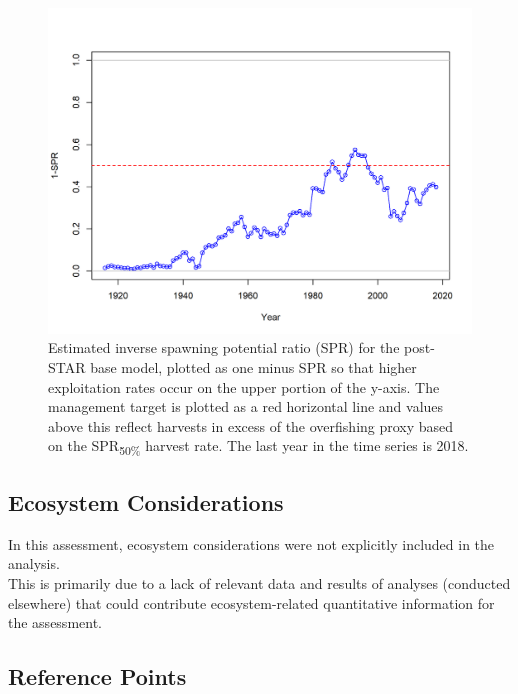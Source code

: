 \documentclass[12pt,]{article}
\begin{document}
\FloatBarrier

\begin{figure}
\centering
\includegraphics{r4ss/plots_mod1/SPR2_minusSPRseries.png}
\caption{Estimated inverse spawning potential ratio (SPR) for the
post-STAR base model, plotted as one minus SPR so that higher
exploitation rates occur on the upper portion of the y-axis. The
management target is plotted as a red horizontal line and values above
this reflect harvests in excess of the overfishing proxy based on the
SPR\textsubscript{50\%} harvest rate. The last year in the time series
is 2018. \label{fig:SPR_all}}
\end{figure}

\FloatBarrier

\subsection*{Ecosystem Considerations}\label{ecosystem-considerations}

In this assessment, ecosystem considerations were not explicitly
included in the analysis.\\
This is primarily due to a lack of relevant data and results of analyses
(conducted elsewhere) that could contribute ecosystem-related
quantitative information for the assessment.

\subsection*{Reference Points}\label{reference-points}
\end{document}
